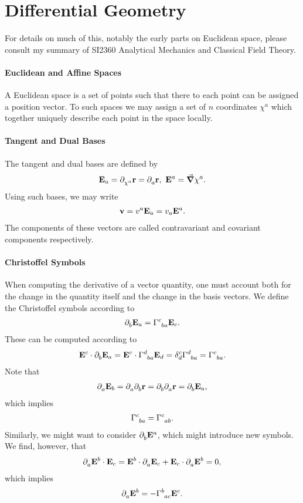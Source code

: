 \section{Differential Geometry}

For details on much of this, notably the early parts on Euclidean space, please consult my summary of SI2360 Analytical Mechanics and Classical Field Theory.

\paragraph{Euclidean and Affine Spaces}
A Euclidean space is a set of points such that there to each point can be assigned a position vector. To such spaces we may assign a set of $n$ coordinates $\chi^{a}$ which together uniquely describe each point in the space locally.

\paragraph{Tangent and Dual Bases}
The tangent and dual bases are defined by
\begin{align*}
	\vb{E}_{a} = \partial^{}_{\chi^{a}}\vb{r} = \partial^{}_{a}\vb{r},\ \vb{E}^{a} = \grad{\chi^{a}}.
\end{align*}
Using such bases, we may write
\begin{align*}
	\vb{v} = v^{a}\vb{E}_{a} = v_{a}\vb{E}^{a}.
\end{align*}
The components of these vectors are called contravariant and covariant components respectively.

\paragraph{Christoffel Symbols}
When computing the derivative of a vector quantity, one must account both for the change in the quantity itself and the change in the basis vectors. We define the Christoffel symbols according to
\begin{align*}
	\del{b}{\tb{a}} = \chris{c}{b}{a}\tb{c}.
\end{align*}
These can be computed according to
\begin{align*}
	\db{c}\cdot\del{b}{\tb{a}} = \db{c}\cdot\chris{d}{b}{a}\tb{d} = \kdelta{d}{c}\chris{d}{b}{a} = \chris{c}{b}{a}.
\end{align*}
Note that
\begin{align*}
	\partial^{}_{a}\vb{E}_{b} = \partial^{}_{a}\partial^{}_{b}\vb{r} = \partial^{}_{b}\partial^{}_{a}\vb{r} = \partial^{}_{b}\vb{E}_{a},
\end{align*}
which implies
\begin{align*}
	\chris{c}{b}{a} = \chris{c}{a}{b}.
\end{align*}
Similarly, we might want to consider $\partial^{}_{b}\vb{E}^{a}$, which might introduce new symbols. We find, however, that
\begin{align*}
	\partial^{}_{a}\vb{E}^{b}\cdot\vb{E}_{c} = \vb{E}^{b}\cdot\partial^{}_{a}\vb{E}_{c} + \vb{E}_{c}\cdot\partial^{}_{a}\vb{E}^{b} = 0,
\end{align*}
which implies
\begin{align*}
	\del{a}{\db{b}} = -\chris{b}{a}{c}\db{c}.
\end{align*}

